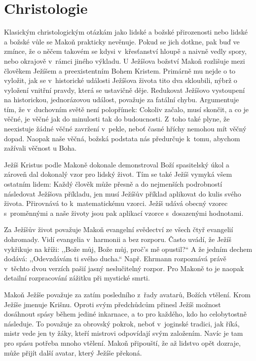 \section{Christologie}

Klasickým christologickým otázkám jako lidské a božské přirozenosti nebo lidské
a božské vůle se Makoň prakticky nevěnuje. Pokud se jich dotkne, pak buď ve
zmínce, že o něčem takovém se kdysi v~křesťanství hloupě a naivně vedly spory,
nebo okrajově v~rámci jiného výkladu. U Ježíšova božství Makoň rozlišuje mezi
člověkem Ježíšem a preexistentním Bohem Kristem. Primárně mu nejde o to
vyložit, jak se v~historické události Ježíšova života tito dva skloubili, nýbrž
o vyložení vnitřní pravdy, která se ustavičně děje. Redukovat Ježíšovo
vystoupení na historickou, jednorázovou událost, považuje za fatální chybu.
Argumentuje tím, že v~duchovním světě není polopřímek: Cokoliv začalo, musí
skončit, a co je věčné, je věčné jak do minulosti tak do budoucnosti. Z~toho
také plyne, že neexistuje žádné věčné zavržení v~pekle, neboť časné hříchy
nemohou mít věčný dopad. Naopak naše věčná, božská podstata nás předurčuje
k~tomu, abychom zažívali věčnost u Boha.

Ježíš Kristus podle Makoně dokonale demonstroval Boží spasitelský úkol a zároveň
dal dokonalý vzor pro lidský život. Tím se také Ježíš vymyká všem ostatním
lidem: Každý člověk může přesně a do nejmenších podrobností následovat Ježíšova
příkladu, jen musí Ježíšův příklad aplikovat do kulis svého života. Přirovnává
to k~matematickému vzorci. Ježíš udává obecný vzorec s~proměnnými a naše životy
jsou pak aplikací vzorce s~dosazenými hodnotami.

Za Ježíšův život považuje Makoň evangelní svědectví ze všech čtyř evangelií
dohromady. Vidí evangelia v~harmonii a bez rozporu. Často uvádí, že Ježíš
vykřikuje na kříži: ,,Bože můj, Bože můj, proč's mě opustil?{}`` A že jedním
dechem dodává: ,,Odevzdávám ti svého ducha.`` Např. Ehrmann rozpoznává právě
v~těchto dvou verzích pašií jasný neslučitelný rozpor\cite{ehrman2000new}. Pro
Makoně to je naopak detailní rozpracování zážitku při mystické smrti.

Makoň Ježíše považuje za zatím posledního z~řady avatarů, Božích vtělení. Krom
Ježíše jmenuje Krišnu. Oproti svým předchůdcům přinesl Ježíš možnost dosáhnout spásy
během jediné inkarnace, a to pro každého, kdo ho celobytostně následuje. To
považuje za obrovský pokrok, neboť v~joginské tradici, jak říká, mistr vede jen
ty žáky, kteří mistrovi odpovídají svým založením. Navíc je tam pro spásu
potřeba mnoho vtělení. Makoň připouští, že až lidstvo opět dozraje, může přijít
další avatar, který Ježíše překoná.

